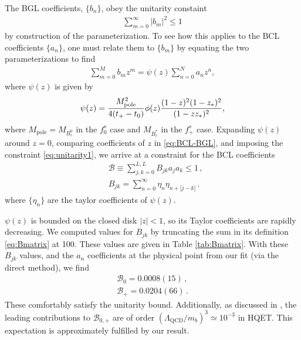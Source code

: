 The BGL coefficients, $\{ b_n \}$, obey the unitarity constaint
\begin{align}
  \sum_{m=0}^{\infty} |b_m|^2 \leq 1
  \label{eq:unitarity1}
\end{align}
by construction of the parameterization. To see how this applies to the BCL coefficients $\{ a_n \}$, one must relate them to $\{ b_m \}$ by equating the two parameterizations to find
\begin{align}
  \label{eq:BCL-BGL}
  \sum^M_{m=0} b_m z^m = \psi(z) \sum_{n=0}^N a_n z^n,
\end{align}
where $\psi(z)$ is given by
\begin{align}
  \psi(z) = { M_{\text{pole}}^2 \over 4(t_+ - t_0) } \phi(z) {(1-z)^2(1-z_*)^2\over (1-zz_*)^2 },
\end{align}
where $M_{\text{pole}}=M_{B_c^0}$ in the $f^s_0$ case and $M_{B_c^*}$ in the $f^s_+$ case. Expanding $\psi(z)$ around $z=0$, comparing coefficients of $z$ in \eqref{eq:BCL-BGL}, and imposing the constraint \eqref{eq:unitarity1}, we arrive at a constraint for the BCL coefficients
\begin{align}
    \label{eq:unitarity2}
    &\mathcal{B} \equiv \sum_{j,k=0}^{L,L} B_{jk} a_j a_k \leq 1\,, \\
    &B_{jk} = \sum_{n=0}^{\infty} \eta_n \eta_{n+|j-k|}\,.
        \label{eq:Bmatrix}
\end{align}
where $\{\eta_n\}$ are the taylor coefficients of $\psi(z)$.

$\psi(z)$ is bounded on the closed disk $|z|<1$, so its Taylor coefficients are rapidly decreasing. We computed values for $B_{jk}$ by truncating the sum in its definition \eqref{eq:Bmatrix} at 100. These values are given in Table \ref{tab:Bmatrix}. With these $B_{jk}$ values, and the $a_n$ coefficients at the physical point from our fit (via the direct method), we find
\begin{align}
  \nonumber
  \mathcal{B}_0 = 0.0008(15)\,,
  \\ \mathcal{B}_+ = 0.0204(66)\,.
  \nonumber
\end{align}
These comfortably satisfy the unitarity bound. Additionally, as discussed in \cite{BECHER200661}, the leading contributions to $\mathcal{B}_{0,+}$ are of order $(\Lambda_{\text{QCD}}/m_b)^3 \simeq 10^{-3}$ in HQET. This expectation is approximately fulfilled by our result.


